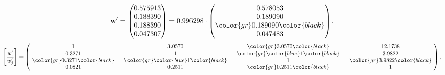 \begin{example}
\begin{equation*}
\mathbf{w}^{\prime} =
\begin{pmatrix}
0.575913\\
0.188390\\
0.188390\\
0.047307
\end{pmatrix} =
0.996298\cdot
\begin{pmatrix}
0.578053\\
0.189090\\
\color{gr} 0.189090\color{black} \\
0.047483
\end{pmatrix},
\end{equation*}
\begin{equation*}
\left[ \frac{{w}^{\prime}_i}{{w}^{\prime}_j} \right] =
\begin{pmatrix}
$\,\,$ 1 $\,\,$ & $\,\,$3.0570$\,\,$ & $\,\,$\color{gr} 3.0570\color{black} $\,\,$ & $\,\,$12.1738$\,\,$ \\
$\,\,$0.3271$\,\,$ & $\,\,$ 1 $\,\,$ & $\,\,$\color{gr} \color{blue} 1\color{black} $\,\,$ & $\,\,$3.9822  $\,\,$ \\
$\,\,$\color{gr} 0.3271\color{black} $\,\,$ & $\,\,$\color{gr} \color{blue} 1\color{black} $\,\,$ & $\,\,$ 1 $\,\,$ & $\,\,$\color{gr} 3.9822\color{black}  $\,\,$ \\
$\,\,$0.0821$\,\,$ & $\,\,$0.2511$\,\,$ & $\,\,$\color{gr} 0.2511\color{black} $\,\,$ & $\,\,$ 1  $\,\,$ \\
\end{pmatrix},
\end{equation*}
\end{example}
\newpage
